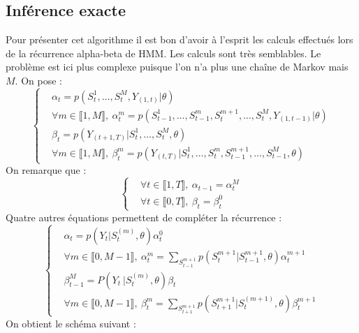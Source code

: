 \documentclass[10pt,a4paper]{article}
\newcommand{\hmm}{\textsc{HMM}}
\begin{document}
\subsection{Inférence exacte}
Pour présenter cet algorithme il est bon d'avoir à l'esprit les calculs effectués lors de la récurrence alpha-beta de \hmm. Les calculs sont très semblables.
Le problème est ici plus complexe puisque l'on n'a plus une chaîne de Markov mais $M$. On pose :
\begin{equation}
\left\lbrace
\begin{aligned}
&\alpha_t=p(S_t^{1},\dots,S_t^{M},Y_{(1,t)}\vert \theta) \\
&\forall m \in \llbracket 1,M \rrbracket, \ \alpha_t^m=p(S_{t-1}^1, \dots, S_{t-1}^m,S_{t}^{m+1}, \dots, S_{t}^M, Y_{(1,t-1)} \vert \theta) \\
&\beta_t=p(Y_{(t+1,T)} \vert S_t^1, \dots,S_t^M, \theta) \\
&\forall m \in \llbracket 1,M \rrbracket, \ \beta_t^m=p(Y_{(t,T)} \vert S_t^1, \dots, S_t^m,S_{t-1}^{m+1}, \dots, S_{t-1}^M, \theta)
\end{aligned}
\right.
\end{equation}
On remarque que :
\begin{equation}
\left\lbrace 
\begin{aligned}
&\forall t \in \llbracket 1,T \rrbracket, \ \alpha_{t-1}=\alpha_{t}^M  \\
&\forall t \in \llbracket 0,T \rrbracket, \ \beta_{t}=\beta_{t}^0
\end{aligned}
\right.
\end{equation}
Quatre autres équations permettent de compléter la récurrence :
\begin{equation}
\left\lbrace
\begin{aligned}
&\alpha_t=p(Y_t \vert S_t^{(m)}, \theta)\alpha_t^0 \\
&\forall m \in \llbracket 0,M-1 \rrbracket, \ \alpha_t^m=\underset{S_{t-1}^{m+1}}{\sum}p(S_t^{m+1} \vert S_{t-1}^{m+1}, \theta) \alpha_t^{m+1} \\
&\beta_{t-1}^M=P( Y_t \ \vert S_t^{(m)},\theta) \beta_t \\
&\forall m \in \llbracket 0, M-1 \rrbracket, \ \beta_t^{m}=\underset{S_{t+1}^{m+1}}{\sum}p(S_{t+1}^{m+1} \vert S_{t}^{(m+1)}, \theta) \beta_{t}^{m+1}
\end{aligned}
\right.
\end{equation}
On obtient le schéma suivant :
\end{document}
